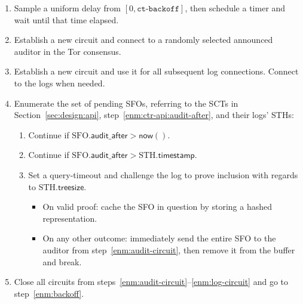


\begin{enumerate}
	\item\label{enm:backoff} Sample a uniform delay from
			$[0, \texttt{ct-backoff}]$,
		then schedule a timer and wait until that time elapsed.
	\item\label{enm:audit-circuit} Establish a new circuit and connect to a
		randomly selected announced auditor in the Tor consensus.
	\item\label{enm:log-circuit} Establish a new circuit and use it for all
		subsequent log connections.  Connect to the logs when needed.
	\item\label{enm:audit-loop} Enumerate the set of pending SFOs, referring to
		the SCTs in Section~\ref{sec:design:api},
		step~\ref{enm:ctr-api:audit-after}, and their logs' STHs:
		\begin{enumerate}
			\item\label{enm:audit-loop:wait-sct} Continue if
				$\textrm{SFO}.\mathsf{audit\_after} > \mathsf{now}()$.
			\item\label{enm:audit-loop:wait-sth} Continue if
				$\textrm{SFO}.\mathsf{audit\_after} >
				\textrm{STH}.\mathsf{timestamp}$.
			\item\label{enm:audit-loop:challenge} Set a query-timeout and
				challenge the log to prove inclusion with regards to
				$\textrm{STH}.\mathsf{treesize}$.
				\begin{itemize}
					\item\label{enm:audit-loop:challenge:success} On valid
						proof: cache the SFO in question by storing a hashed
						representation.
					\item\label{enm:audit-loop:challenge:fail} On any other
						outcome: immediately send the entire SFO to the auditor
						from step~\ref{enm:audit-circuit}, then remove it from
						the buffer and break.
				\end{itemize}
		\end{enumerate}
	\item\label{enm:teardown} Close all circuits from
		steps~\ref{enm:audit-circuit}--\ref{enm:log-circuit} and go to
		step~\ref{enm:backoff}.
\end{enumerate}

